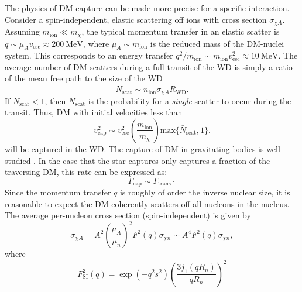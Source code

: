 \documentclass[preprintnumbers,amsmath,amssymb,prd,superscriptaddress]{revtex4}
\newcommand{\Eboom}{\mathcal{E}_\text{boom}}
\newcommand{\MeV}{\text{MeV}}
\newcommand{\cm}{\text{cm}}
\def\r{\right)}
\def\l{\left(}
\begin{document}
The physics of DM capture can be made more precise for a specific interaction.
Consider a spin-independent, elastic scattering off ions with cross section $\sigma_{\chi A}$. 
Assuming $m_\text{ion} \ll m_\chi$, the typical momentum transfer in an elastic scatter is $q \sim \mu_{A} v_\text{esc} \approx 200 ~\MeV$, where $\mu_{A} \sim m_\text{ion}$ is the reduced mass of the DM-nuclei system. 
This corresponds to an energy transfer $q^2/m_\text{ion} \sim m_\text{ion} v_\text{esc}^2 \approx 10 ~\MeV$. 
The average number of DM scatters during a full transit of the WD is simply a ratio of the mean free path to the size of the WD
\begin{equation}
\bar{N}_\text{scat} \sim n_\text{ion} \sigma_{\chi A} R_\text{WD}.
\end{equation}
If $\bar{N}_\text{scat} < 1$, then $\bar{N}_\text{scat}$ is the probability for a \emph{single} scatter to occur during the transit. 
Thus, DM with initial velocities less than
\begin{equation}
\label{eq:capture}
v_\text{cap}^2 \sim v_\text{esc}^2 \l \frac{m_\text{ion}}{m_\chi} \r \text{max}\{\bar{N}_\text{scat} ,1\}.
\end{equation}
will be captured in the WD. 
The capture of DM in gravitating bodies is well-studied \cite{Gould}. 
In the case that the star captures only captures a fraction of the traversing DM, this rate can be expressed as:
\begin{equation}
\Gamma_\text{cap} \sim \Gamma_\text{trans} \cdot 
\end{equation}
Since the momentum transfer $q$ is roughly of order the inverse nuclear size, it is reasonable to expect the DM coherently scatters off all nucleons in the nucleus. 
The average per-nucleon cross section (spin-independent) is given by
\begin{equation}
\sigma_{\chi A} = A^2 \l \frac{\mu_{A}}{\mu_{n}}\r^2 F^2(q) \sigma_{\chi n} \sim A^4 F^2(q) \sigma_{\chi n},
\end{equation}
where 
\begin{equation}
F_\text{SI}^2(q) = \exp (-q^2 s^2) \left(\frac{3 j_1(q R_n)}{q R_n}\right)^2 
\end{equation}
\end{document}
